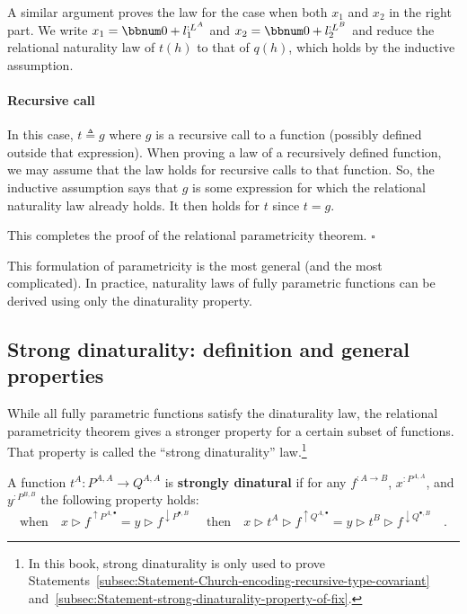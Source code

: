 A similar argument proves the law for the case when both $x_{1}$
and $x_{2}$ in the right part. We write $x_{1}=\bbnum 0+l_{1}^{:L^{A}}$
and $x_{2}=\bbnum 0+l_{2}^{:L^{B}}$ and reduce the relational naturality
law of $t(h)$ to that of $q(h)$, which holds by the inductive assumption.

\paragraph{Recursive call}

In this case, $t\triangleq g$ where $g$ is a recursive call to a
function (possibly defined outside that expression). When proving
a law of a recursively defined function, we may assume that the law
holds for recursive calls to that function. So, the inductive assumption
says that $g$ is some expression for which the relational naturality
law already holds. It then holds for $t$ since $t=g$.

This completes the proof of the relational parametricity theorem.
$\square$

This formulation of parametricity is the most general (and the most
complicated). In practice, naturality laws of fully parametric functions
can be derived using only the dinaturality property.

\subsection{Strong dinaturality: definition and general properties\label{subsec:Strong-dinaturality.-General-properties}}

While all fully parametric functions satisfy the dinaturality law,
the relational parametricity theorem gives a stronger property for
a certain subset of functions. That property is called the \textsf{``}strong
dinaturality\textsf{''} law.\footnote{In this book, strong dinaturality is only used to prove Statements~\ref{subsec:Statement-Church-encoding-recursive-type-covariant}
and~\ref{subsec:Statement-strong-dinaturality-property-of-fix}.}

A function $t^{A}:P^{A,A}\rightarrow Q^{A,A}$ is \textbf{strongly
dinatural} if for any $f^{:A\rightarrow B}$,
$x^{:P^{A,A}}$, and $y^{:P^{B,B}}$ the following property holds:
\begin{equation}
\text{when}\quad x\triangleright f^{\uparrow P^{A,\bullet}}=y\triangleright f^{\downarrow P^{\bullet,B}}\quad\text{ then}\quad x\triangleright t^{A}\triangleright f^{\uparrow Q^{A,\bullet}}=y\triangleright t^{B}\triangleright f^{\downarrow Q^{\bullet,B}}\quad.\label{eq:strong-dinaturality-law}
\end{equation}

